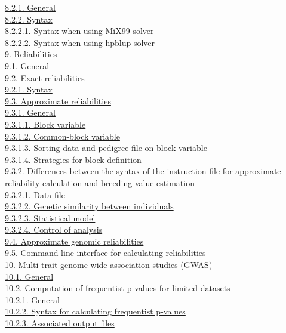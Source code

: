 \hyperref[Cont08]{8.2.1. General}\\
\hyperref[Cont09]{8.2.2. Syntax}\\
\hyperref[Cont10]{8.2.2.1. Syntax when using MiX99 solver}\\
\hyperref[Cont11]{8.2.2.2. Syntax when using hpblup solver}\\
\hyperref[Reli01]{9. Reliabilities}\\
\hyperref[Reli02]{9.1. General}\\
\hyperref[Reli03]{9.2. Exact reliabilities}\\
\hyperref[Reli05]{9.2.1. Syntax}\\
\hyperref[Reli07]{9.3. Approximate reliabilities}\\
\hyperref[Reli08]{9.3.1. General}\\
\hyperref[Reli10]{9.3.1.1. Block variable}\\
\hyperref[Reli11]{9.3.1.2. Common-block variable}\\
\hyperref[Reli12]{9.3.1.3. Sorting data and pedigree file on block
variable}\\
\hyperref[Reli13]{9.3.1.4. Strategies for block definition}\\
\hyperref[Reli14]{9.3.2. Differences between the syntax of the
instruction file for approximate reliability calculation and breeding
value estimation}\\
\hyperref[Reli15]{9.3.2.1. Data file}\\
\hyperref[Reli16]{9.3.2.2. Genetic similarity between individuals}\\
\hyperref[Reli17]{9.3.2.3. Statistical model}\\
\hyperref[Reli18]{9.3.2.4. Control of analysis}\\
\hyperref[Reli21]{9.4. Approximate genomic reliabilities}\\
\hyperref[Reli26]{9.5. Command-line interface for calculating
reliabilities}\\
\hyperref[MTGW01]{10. Multi-trait genome-wide association studies
(GWAS)}\\
\hyperref[MTGW02]{10.1. General}\\
\hyperref[MTGW03]{10.2. Computation of frequentist p-values for limited
datasets}\\
\hyperref[MTGW04]{10.2.1. General}\\
\hyperref[MTGW05]{10.2.2. Syntax for calculating frequentist p-values}\\
\hyperref[MTGW06]{10.2.3. Associated output files}\\
